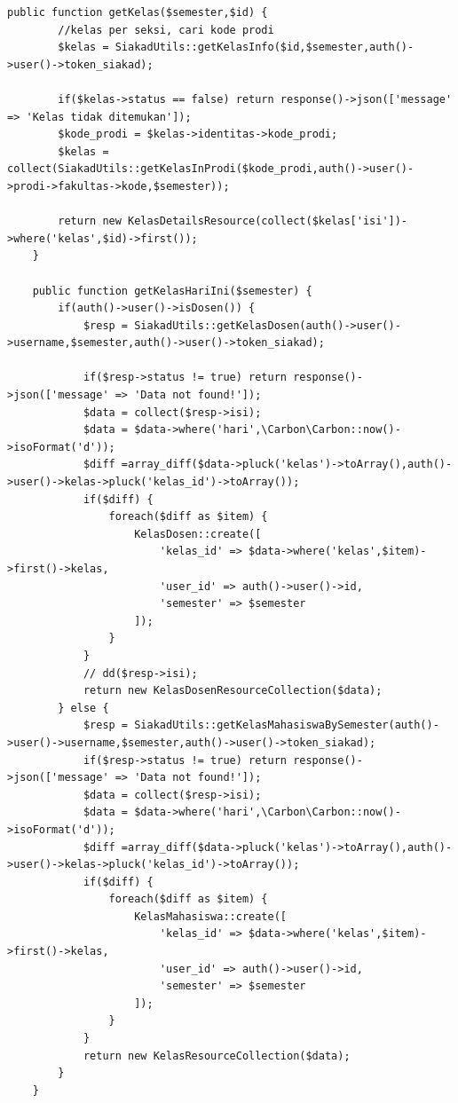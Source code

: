 \begin{lstlisting}[breaklines]
    public function getKelas($semester,$id) {
        //kelas per seksi, cari kode prodi
        $kelas = SiakadUtils::getKelasInfo($id,$semester,auth()->user()->token_siakad);

        if($kelas->status == false) return response()->json(['message' => 'Kelas tidak ditemukan']);
        $kode_prodi = $kelas->identitas->kode_prodi;
        $kelas = collect(SiakadUtils::getKelasInProdi($kode_prodi,auth()->user()->prodi->fakultas->kode,$semester));

        return new KelasDetailsResource(collect($kelas['isi'])->where('kelas',$id)->first());
    }

    public function getKelasHariIni($semester) {
        if(auth()->user()->isDosen()) {
            $resp = SiakadUtils::getKelasDosen(auth()->user()->username,$semester,auth()->user()->token_siakad);

            if($resp->status != true) return response()->json(['message' => 'Data not found!']);
            $data = collect($resp->isi);
            $data = $data->where('hari',\Carbon\Carbon::now()->isoFormat('d'));
            $diff =array_diff($data->pluck('kelas')->toArray(),auth()->user()->kelas->pluck('kelas_id')->toArray());
            if($diff) {
                foreach($diff as $item) {
                    KelasDosen::create([
                        'kelas_id' => $data->where('kelas',$item)->first()->kelas,
                        'user_id' => auth()->user()->id,
                        'semester' => $semester
                    ]);
                }
            }
            // dd($resp->isi);
            return new KelasDosenResourceCollection($data);
        } else {
            $resp = SiakadUtils::getKelasMahasiswaBySemester(auth()->user()->username,$semester,auth()->user()->token_siakad);
            if($resp->status != true) return response()->json(['message' => 'Data not found!']);
            $data = collect($resp->isi);
            $data = $data->where('hari',\Carbon\Carbon::now()->isoFormat('d'));
            $diff =array_diff($data->pluck('kelas')->toArray(),auth()->user()->kelas->pluck('kelas_id')->toArray());
            if($diff) {
                foreach($diff as $item) {
                    KelasMahasiswa::create([
                        'kelas_id' => $data->where('kelas',$item)->first()->kelas,
                        'user_id' => auth()->user()->id,
                        'semester' => $semester
                    ]);
                }
            }
            return new KelasResourceCollection($data);
        }
    }


\end{lstlisting}
